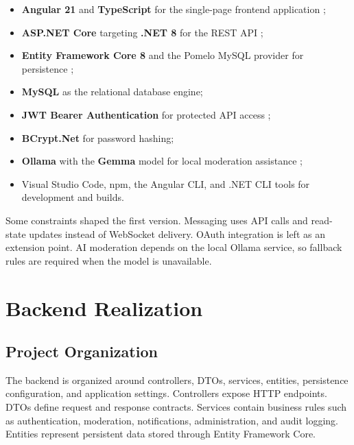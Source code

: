 \begin{itemize}
    \item \textbf{Angular 21} and \textbf{TypeScript} for the single-page frontend application \cite{angular_docs};
    \item \textbf{ASP.NET Core} targeting \textbf{.NET 8} for the REST API \cite{aspnetcore_docs,dotnet_docs};
    \item \textbf{Entity Framework Core 8} and the Pomelo MySQL provider for persistence \cite{efcore_docs,mysql_docs};
    \item \textbf{MySQL} as the relational database engine;
    \item \textbf{JWT Bearer Authentication} for protected API access \cite{jwt_rfc};
    \item \textbf{BCrypt.Net} for password hashing;
    \item \textbf{Ollama} with the \textbf{Gemma} model for local moderation assistance \cite{ollama_docs};
    \item Visual Studio Code, npm, the Angular CLI, and .NET CLI tools for development and builds.
\end{itemize}

Some constraints shaped the first version. Messaging uses API calls and read-state updates instead of WebSocket delivery. OAuth integration is left as an extension point. AI moderation depends on the local Ollama service, so fallback rules are required when the model is unavailable.

\section{Backend Realization}

\subsection{Project Organization}

The backend is organized around controllers, DTOs, services, entities, persistence configuration, and application settings. Controllers expose HTTP endpoints. DTOs define request and response contracts. Services contain business rules such as authentication, moderation, notifications, administration, and audit logging. Entities represent persistent data stored through Entity Framework Core.

